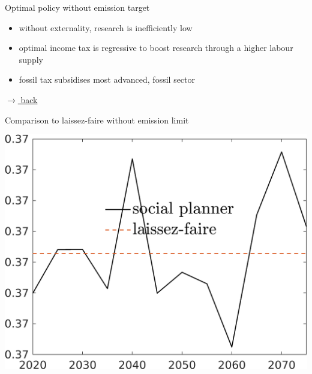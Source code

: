 \documentclass[11pt,aspectratio=169]{beamer}
\begin{document}
\begin{frame}{Optimal policy without emission target}
	\vspace{7mm}
	\begin{itemize}
		\item without externality, research is inefficiently low
		\vspace{2mm}
		\item optimal income tax is regressive to boost research through a higher labour supply
				\vspace{2mm}
		\item fossil tax subsidises most advanced, fossil sector
	\end{itemize}
	\vspace{1mm}
	\hfill
	\hyperlink{backmainres}{\tiny{$\rightarrow$ back}} 
\end{frame}

\begin{frame}{Comparison to laissez-faire without emission limit}
	\vspace{-1mm}
\begin{minipage}[]{0.32\textwidth}
	\includegraphics[width=1\textwidth]{../codding_model/own_basedOnFried/optimalPol_elastS_DisuSci/figures/all_1705/hh_LFCompSP_NOT_spillover0_noskill1_sep1_BN0_ineq0_red0_xgrowth0_etaa0.79_lgd1.png}
\end{minipage}
\begin{minipage}[]{0.32\textwidth}

\end{minipage}
\end{frame}
\end{document}
